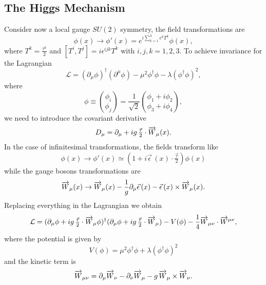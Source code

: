 \subsection{The Higgs Mechanism}
\label{sec:higgs-model}
Consider now a local gauge $SU(2)$ symmetry, the field transformations
are
\begin{equation}
  \label{eq:32}
  \phi(x) \rightarrow \phi'(x) = e^{i \textstyle{\sum_{k = 1}^{3}}
    \epsilon^{k} T^{k}} \phi(x),
\end{equation}
where $T^{k} = \frac{\tau^{k}}{2}$ and $[T^{i},T^{j}] = i
\epsilon^{ijk}T^{k}$ with $i,j,k = 1,2,3$. To achieve invariance for
the Lagrangian
\begin{equation}
  \label{eq:33}
  \mathcal{L} =(\partial_{\mu} \phi)^{\dagger}(\partial^{\mu} \phi) -
  \mu^{2}\phi^{\dagger}\phi - \lambda (\phi^{\dagger}\phi)^{2},
\end{equation}
where
\begin{equation}
  \label{eq:34}
  \phi \equiv \binom{\phi_{i}}{\phi_{j}} = \frac{1}{\sqrt{2}}
  \binom{\phi_{1} + i \phi_{2}}{\phi_{3} + i \phi_{4}},
\end{equation}
we need to introduce the covariant derivative
\begin{equation}
  \label{eq:35}
  D_{\mu} = \partial_{\mu} + i g\,\tfrac{\vec \tau}{2} \cdot \overrightarrow{W}_{\mu}(x).
\end{equation}
In the case of infinitesimal transformations, the fields transform
like
\begin{equation}
  \label{eq:36}
  \phi(x) \rightarrow \phi'(x) \simeq ( 1 + i \vec \epsilon\, (x) \cdot
  \tfrac{\vec \tau}{2}) \phi(x)
\end{equation}
while the gauge bosons transformations are
\begin{equation}
  \label{eq:37}
  \overrightarrow{W}_{\mu} (x) \rightarrow \overrightarrow{W}_{\mu}(x) -
  \frac{1}{g} \partial_{\mu} \vec \epsilon \, (x) - \vec \epsilon\,(x)
  \times \overrightarrow{W}_{\mu} (x).
\end{equation}
Replacing everything in the Lagrangian we obtain
\begin{equation}
  \label{eq:38}
  \mathcal{L} = ( \partial_{\mu} \phi + i g\,\tfrac{\vec \tau}{2}
  \cdot \overrightarrow{W}_{\mu} \phi)^{\dagger} (\partial_{\mu} \phi + i
  g\,\tfrac{\vec \tau}{2} \cdot \overrightarrow{W}_{\mu}) - V(\phi) -
  \frac{1}{4} \overrightarrow{W}_{\mu\nu} \cdot \overrightarrow{W}^{\mu\nu},
\end{equation}
where the potential is given by
\begin{equation}
  \label{Esq:40}
  V(\phi) = \mu^{2} \phi^{\dagger} \phi + \lambda(\phi^{\dagger} \phi)^{2}
\end{equation}
and the kinetic term is
\begin{equation}
  \label{eq:39}
  \overrightarrow{W}_{\mu\nu} = \partial_{\mu} \overrightarrow{W}_{\nu} - \partial_{\nu} \overrightarrow{W}_{\mu}
  - g\,\overrightarrow{W}_{\mu} \times \overrightarrow{W}_{\nu}.
\end{equation}

